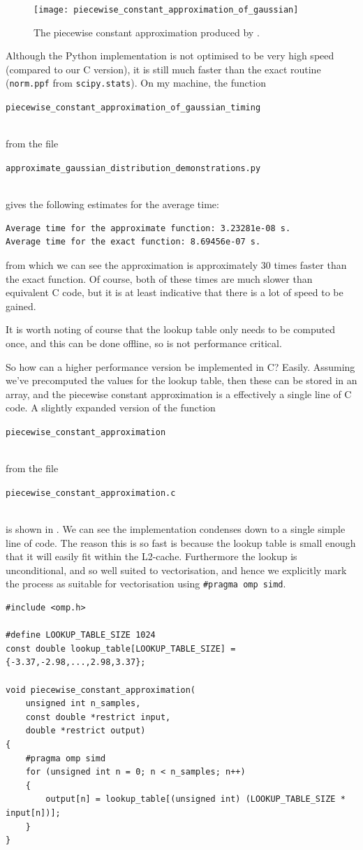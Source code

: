 \documentclass[11pt,a4paper,oneside,english]{extarticle}
\newcommand{\singlecodeline}[1]{\\[1em]\centerline{\lstinline[basicstyle=\ttfamily]$#1$}\\[1em]}
\begin{document}
\begin{figure}[htb]
\centering
\texttt{[image: piecewise\_constant\_approximation\_of\_gaussian]}
\caption{The piecewise constant approximation produced by .}
\label{fig:piecewise_constant_approximation_of_gaussian}
\end{figure}

Although the Python implementation is not optimised to be very high speed (compared to our C version), it is still much faster than the exact routine (\verb|norm.ppf| from \verb|scipy.stats|). On my machine, the function \singlecodeline{piecewise_constant_approximation_of_gaussian_timing} from the file \singlecodeline{approximate_gaussian_distribution_demonstrations.py} gives the following estimates for the average time:
\begin{verbatim}
Average time for the approximate function: 3.23281e-08 s.
Average time for the exact function: 8.69456e-07 s.
\end{verbatim}
from which we can see the approximation is approximately 30 times faster than the exact function. Of course, both of these times are much slower than equivalent C code, but it is at least indicative that there is a lot of speed to be gained. 


It is worth noting of course that the lookup table only needs to be computed once, and this can be done offline, so is not performance critical. 

So how can a higher performance version be implemented in C? Easily. Assuming we've precomputed the values for the lookup table, then these can be stored in an array, and the piecewise constant approximation is a effectively a single line of C code. A slightly expanded version of the function \singlecodeline{piecewise_constant_approximation}
from the file \singlecodeline{piecewise_constant_approximation.c}
is shown in . We can see the implementation condenses down to a single simple line of code. The reason this is so fast is because the lookup table is small enough that it will easily fit within the L2-cache. Furthermore the lookup is unconditional, and so well suited to vectorisation, and hence we explicitly mark the process as suitable for vectorisation using \verb|#pragma omp simd|.

\begin{lstfloat}[htb]
\begin{lstlisting}[style=C, captionpos=b, caption={Constructing a piecewise constant approximation.}, label={code:c:piecewise_constant_approximation}]
#include <omp.h>

#define LOOKUP_TABLE_SIZE 1024
const double lookup_table[LOOKUP_TABLE_SIZE] = {-3.37,-2.98,...,2.98,3.37};

void piecewise_constant_approximation(
    unsigned int n_samples, 
    const double *restrict input, 
    double *restrict output)
{
    #pragma omp simd
    for (unsigned int n = 0; n < n_samples; n++)
    {
        output[n] = lookup_table[(unsigned int) (LOOKUP_TABLE_SIZE * input[n])];
    }
}
\end{lstlisting}
\end{lstfloat}
\end{document}
